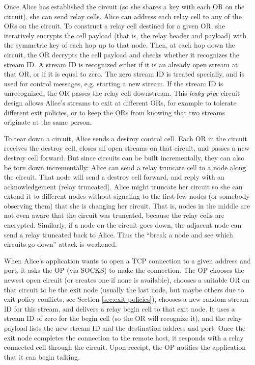 \documentclass[times,10pt,twocolumn]{article}
\begin{document}
Once Alice has established the circuit (so she shares a key with each
OR on the circuit), she can send relay cells.
Alice can address each relay cell to any of the ORs on the circuit. To
construct a relay cell destined for a given OR, she iteratively
encrypts the cell payload (that is, the relay header and payload)
with the symmetric key of each hop up to that node. Then, at each hop
down the circuit, the OR decrypts the cell payload and checks whether
it recognizes the stream ID. A stream ID is recognized either if it
is an already open stream at that OR, or if it is equal to zero. The
zero stream ID is treated specially, and is used for control messages,
e.g. starting a new stream. If the stream ID is unrecognized, the OR
passes the relay cell downstream. This \emph{leaky pipe} circuit design
allows Alice's streams to exit at different ORs, for example to tolerate
different exit policies, or to keep the ORs from knowing that two streams
originate at the same person.

To tear down a circuit, Alice sends a destroy control cell. Each OR
in the circuit receives the destroy cell, closes all open streams on
that circuit, and passes a new destroy cell forward. But since circuits
can be built incrementally, they can also be torn down incrementally:
Alice can send a relay truncate cell to a node along the circuit. That
node will send a destroy cell forward, and reply with an acknowledgement
(relay truncated). Alice might truncate her circuit so she can extend it
to different nodes without signaling to the first few nodes (or somebody
observing them) that she is changing her circuit. That is, nodes in the
middle are not even aware that the circuit was truncated, because the
relay cells are encrypted. Similarly, if a node on the circuit goes down,
the adjacent node can send a relay truncated back to Alice. Thus the
``break a node and see which circuits go down'' attack is weakened.

\label{subsec:tcp}

When Alice's application wants to open a TCP connection to a given
address and port, it asks the OP (via SOCKS) to make the connection. The
OP chooses the newest open circuit (or creates one if none is available),
chooses a suitable OR on that circuit to be the exit node (usually the
last node, but maybe others due to exit policy conflicts; see Section
\ref{sec:exit-policies}), chooses a new random stream ID for this stream,
and delivers a relay begin cell to that exit node. It uses a stream ID
of zero for the begin cell (so the OR will recognize it), and the relay
payload lists the new stream ID and the destination address and port.
Once the exit node completes the connection to the remote host, it
responds with a relay connected cell through the circuit. Upon receipt,
the OP notifies the application that it can begin talking.
\end{document}
